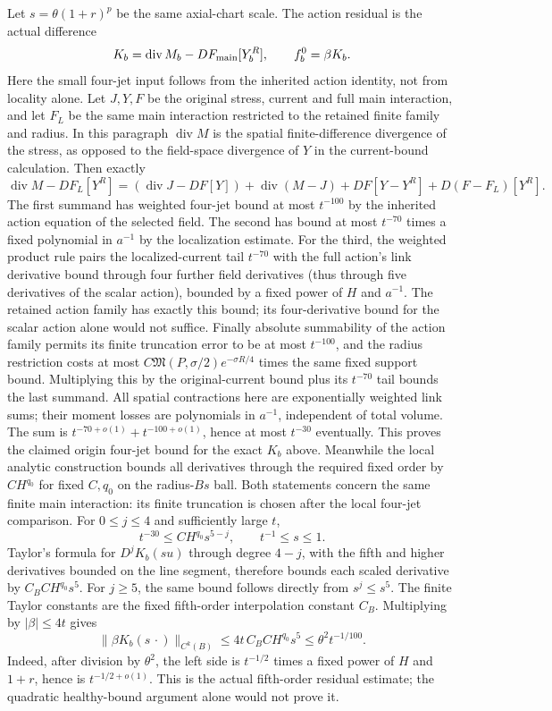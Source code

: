 Let $s=\theta(1+r)^p$ be the same axial-chart scale. The action residual
is the actual difference
\[
 K_b=\operatorname{div}M_b-D F_{\rm main}[Y_b^R],
 \qquad f_b^0=\beta K_b.
\]
Here the small four-jet input follows from the inherited action identity,
not from locality alone. Let $J,Y,F$ be the original stress, current and
full main interaction, and let $F_L$ be the same main interaction
restricted to the retained finite family and radius. In this paragraph
$\operatorname{div}M$ is the spatial finite-difference divergence of
the stress, as opposed to the field-space divergence of $Y$ in the
current-bound calculation. Then exactly
\[
 \operatorname{div}M-DF_L[Y^R]
 = (\operatorname{div}J-DF[Y])
    +\operatorname{div}(M-J)
    +DF[Y-Y^R]+D(F-F_L)[Y^R].
\]
The first summand has weighted four-jet bound at most $t^{-100}$ by
the inherited action equation of the selected field. The second has
bound at most $t^{-70}$ times a fixed polynomial in $a^{-1}$ by the
localization estimate. For the third, the weighted product rule pairs
the localized-current tail $t^{-70}$ with the full action's link
derivative bound through four further field derivatives (thus through
five derivatives of the scalar action), bounded by a fixed power of
$H$ and $a^{-1}$. The retained action family has exactly this bound;
its four-derivative bound for the scalar action alone would not suffice. Finally absolute
summability of the action family permits its finite truncation error to
be at most $t^{-100}$, and the radius restriction costs at most
$C\mathfrak M(P,\sigma/2)e^{-\sigma R/4}$ times the
same fixed support bound. Multiplying this by the original-current
bound plus its $t^{-70}$ tail bounds the last summand. All spatial
contractions here are exponentially weighted link sums; their moment
losses are polynomials in $a^{-1}$, independent of total volume.
The sum is $t^{-70+o(1)}+t^{-100+o(1)}$, hence at most $t^{-30}$
eventually. This proves the claimed origin four-jet bound for the exact
$K_b$ above. Meanwhile the local analytic construction
bounds all derivatives through the required fixed order by $C H^{q_0}$
for fixed $C,q_0$
on the radius-$Bs$ ball. Both statements concern the same finite main
interaction: its finite truncation is chosen after the local four-jet
comparison. For $0\le j\le4$ and sufficiently large $t$,
\[
 t^{-30}\le C H^{q_0}s^{5-j},\qquad t^{-1}\le s\le1.
\]
Taylor's formula for $D^jK_b(su)$ through degree $4-j$, with the fifth
and higher derivatives bounded on the line segment, therefore bounds
each scaled derivative by $C_B C H^{q_0}s^5$. For $j\ge5$, the same
bound follows directly from $s^j\le s^5$. The finite Taylor constants
are the fixed fifth-order interpolation constant $C_B$. Multiplying by
$|\beta|\le4t$ gives
\[
 \|\beta K_b(s\,\cdot)\|_{C^k(B)}
 \le4t\,C_B C H^{q_0}s^5
 \le\theta^2t^{-1/100}.
\]
Indeed, after division by $\theta^2$, the left side is
$t^{-1/2}$ times a fixed power of $H$ and $1+r$, hence is
$t^{-1/2+o(1)}$. This is the actual fifth-order residual estimate; the
quadratic healthy-bound argument alone would not prove it.

